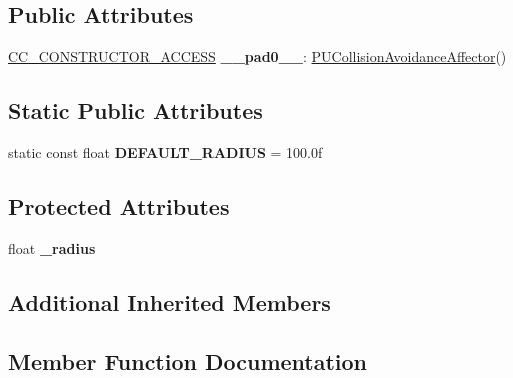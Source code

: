 \subsection*{Public Attributes}
\begin{DoxyCompactItemize}
\item 
\mbox{\label{classPUCollisionAvoidanceAffector_ad252a4bbd815f9450e739ecd16a0d012}} 
\hyperlink{_2cocos2d_2cocos_2base_2ccConfig_8h_a25ef1314f97c35a2ed3d029b0ead6da0}{C\+C\+\_\+\+C\+O\+N\+S\+T\+R\+U\+C\+T\+O\+R\+\_\+\+A\+C\+C\+E\+SS} {\bfseries \+\_\+\+\_\+pad0\+\_\+\+\_\+}\+: \hyperlink{classPUCollisionAvoidanceAffector}{P\+U\+Collision\+Avoidance\+Affector}()
\end{DoxyCompactItemize}
\subsection*{Static Public Attributes}
\begin{DoxyCompactItemize}
\item 
\mbox{\label{classPUCollisionAvoidanceAffector_a296315c2ac68ae463aadb653ae0a72df}} 
static const float {\bfseries D\+E\+F\+A\+U\+L\+T\+\_\+\+R\+A\+D\+I\+US} = 100.\+0f
\end{DoxyCompactItemize}
\subsection*{Protected Attributes}
\begin{DoxyCompactItemize}
\item 
\mbox{\label{classPUCollisionAvoidanceAffector_acec568c6f0e35ee3311db37ac85244db}} 
float {\bfseries \+\_\+radius}
\end{DoxyCompactItemize}
\subsection*{Additional Inherited Members}


\subsection{Member Function Documentation}
\mbox{\label{classPUCollisionAvoidanceAffector_a29581c500069ea205d3621ff8d11c920}} 
